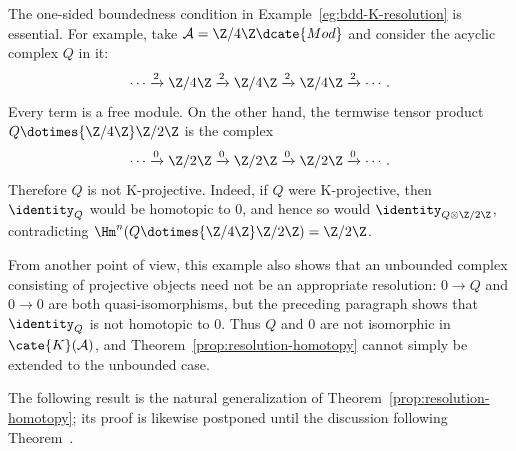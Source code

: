 \begin{example}[A.\ Dold]
	The one-sided boundedness condition in Example~\ref{eg:bdd-K-resolution}
	is essential. For example, take
	$\mathcal{A}=\Z/4\Z\dcate{Mod}$ and consider the acyclic complex $Q$
	in it:
	\[
	\cdots \xrightarrow{2} \Z/4\Z \xrightarrow{2} \Z/4\Z
	\xrightarrow{2} \Z/4\Z \xrightarrow{2} \cdots.
	\]
	Every term is a free module. On the other hand, the termwise tensor
	product $Q\dotimes{\Z/4\Z}\Z/2\Z$ is the complex
	\[
	\cdots \xrightarrow{0} \Z/2\Z \xrightarrow{0} \Z/2\Z
	\xrightarrow{0} \Z/2\Z \xrightarrow{0} \cdots.
	\]
	Therefore $Q$ is not K-projective. Indeed, if $Q$ were K-projective,
	then $\identity_Q$ would be homotopic to $0$, and hence so would
	$\identity_{Q\otimes\Z/2\Z}$, contradicting
	$\Hm^n(Q\dotimes{\Z/4\Z}\Z/2\Z)=\Z/2\Z$.

	From another point of view, this example also shows that an unbounded
	complex consisting of projective objects need not be an appropriate
	resolution: $0\to Q$ and $0\to0$ are both quasi-isomorphisms, but the
	preceding paragraph shows that $\identity_Q$ is not homotopic to $0$.
	Thus $Q$ and $0$ are not isomorphic in $\cate{K}(\mathcal{A})$, and
	Theorem~\ref{prop:resolution-homotopy} cannot simply be extended to the
	unbounded case.
\end{example}

The following result is the natural generalization of
Theorem~\ref{prop:resolution-homotopy}; its proof is likewise postponed until
the discussion following
Theorem~.

